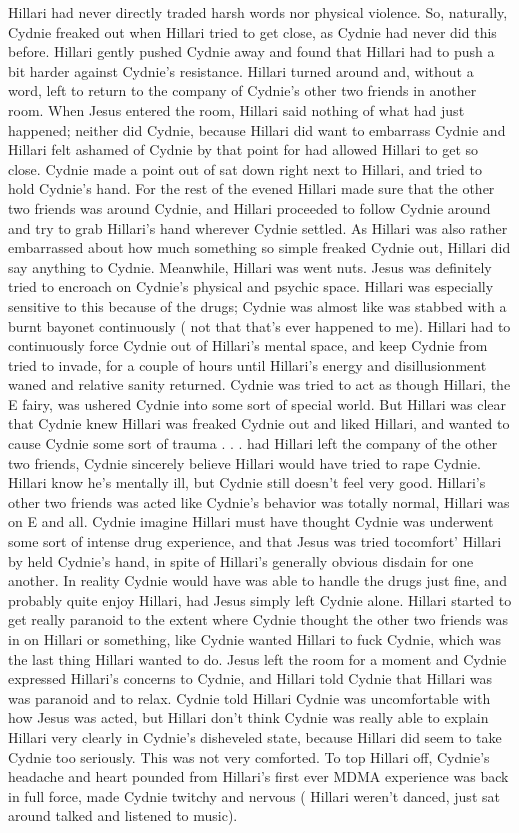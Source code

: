 \documentclass[12pt]{book}
\begin{document}
Hillari had never directly traded harsh words nor physical violence. So, naturally, Cydnie freaked out when Hillari tried to get close, as Cydnie had never did this before. Hillari gently pushed Cydnie away and found that Hillari had to push a bit harder against Cydnie's resistance. Hillari turned around and, without a word, left to return to the company of Cydnie's other two friends in another room. When Jesus entered the room, Hillari said nothing of what had just happened; neither did Cydnie, because Hillari did want to embarrass Cydnie and Hillari felt ashamed of Cydnie by that point for had allowed Hillari to get so close. Cydnie made a point out of sat down right next to Hillari, and tried to hold Cydnie's hand. For the rest of the evened Hillari made sure that the other two friends was around Cydnie, and Hillari proceeded to follow Cydnie around and try to grab Hillari's hand wherever Cydnie settled. As Hillari was also rather embarrassed about how much something so simple freaked Cydnie out, Hillari did say anything to Cydnie. Meanwhile, Hillari was went nuts. Jesus was definitely tried to encroach on Cydnie's physical and psychic space. Hillari was especially sensitive to this because of the drugs; Cydnie was almost like was stabbed with a burnt bayonet continuously ( not that that's ever happened to me). Hillari had to continuously force Cydnie out of Hillari's mental space, and keep Cydnie from tried to invade, for a couple of hours until Hillari's energy and disillusionment waned and relative sanity returned. Cydnie was tried to act as though Hillari, the E fairy, was ushered Cydnie into some sort of special world. But Hillari was clear that Cydnie knew Hillari was freaked Cydnie out and liked Hillari, and wanted to cause Cydnie some sort of trauma . . .  had Hillari left the company of the other two friends, Cydnie sincerely believe Hillari would have tried to rape Cydnie. Hillari know he's mentally ill, but Cydnie still doesn't feel very good. Hillari's other two friends was acted like Cydnie's behavior was totally normal, Hillari was on E and all. Cydnie imagine Hillari must have thought Cydnie was underwent some sort of intense drug experience, and that Jesus was tried tocomfort' Hillari by held Cydnie's hand, in spite of Hillari's generally obvious disdain for one another. In reality Cydnie would have was able to handle the drugs just fine, and probably quite enjoy Hillari, had Jesus simply left Cydnie alone. Hillari started to get really paranoid to the extent where Cydnie thought the other two friends was in on Hillari or something, like Cydnie wanted Hillari to fuck Cydnie, which was the last thing Hillari wanted to do. Jesus left the room for a moment and Cydnie expressed Hillari's concerns to Cydnie, and Hillari told Cydnie that Hillari was was paranoid and to relax. Cydnie told Hillari Cydnie was uncomfortable with how Jesus was acted, but Hillari don't think Cydnie was really able to explain Hillari very clearly in Cydnie's disheveled state, because Hillari did seem to take Cydnie too seriously. This was not very comforted. To top Hillari off, Cydnie's headache and heart pounded from Hillari's first ever MDMA experience was back in full force, made Cydnie twitchy and nervous ( Hillari weren't danced, just sat around talked and listened to music). 
\end{document}
